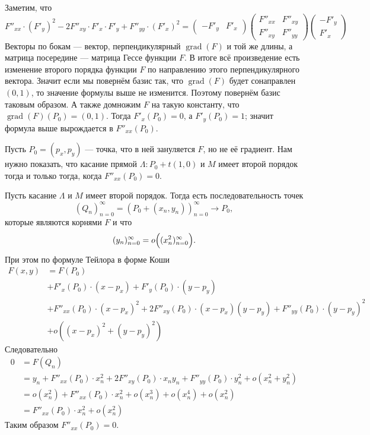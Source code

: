 \documentclass[12pt,a4paper]{article}
\DeclareMathOperator{\grad}{grad}
\begin{document}
    \begin{enumproblem}
        Заметим, что
        \[
            F''_{xx} \cdot (F'_y)^2 - 2 F''_{xy} \cdot F'_x \cdot F'_y + F''_{yy} \cdot (F'_x)^2
            =
            \begin{pmatrix}
                -F'_y& F'_x
            \end{pmatrix}
            \begin{pmatrix}
                F''_{xx}& F''_{xy}\\
                F''_{xy}& F''_{yy}
            \end{pmatrix}
            \begin{pmatrix}
                -F'_y\\ F'_x
            \end{pmatrix}
        \]
        Векторы по бокам --- вектор, перпендикулярный $\grad(F)$ и той же длины, а матрица посередине --- матрица Гессе функции $F$. В итоге всё произведение есть изменение второго порядка функции $F$ по направлению этого перпендикулярного вектора. Значит если мы повернём базис так, что $\grad(F)$ будет сонаправлен $(0, 1)$, то значение формулы выше не изменится. Поэтому повернём базис таковым образом. А также домножим $F$ на такую константу, что $\grad(F)(P_0) = (0, 1)$. Тогда $F'_x(P_0) = 0$, а $F'_y(P_0) = 1$; значит формула выше вырождается в $F''_{xx}(P_0)$.

        Пусть $P_0 = (p_x, p_y)$ --- точка, что в ней зануляется $F$, но не её градиент. Нам нужно показать, что касание прямой $\Lambda: P_0 + t (1, 0)$ и $M$ имеет второй порядок тогда и только тогда, когда $F''_{xx}(P_0) = 0$.

        Пусть касание $\Lambda$ и $M$ имеет второй порядок. Тогда есть последовательность точек
        \[(Q_n)_{n=0}^\infty = (P_0 + (x_n, y_n))_{n=0}^\infty \to P_0,\]
        которые являются корнями $F$ и что
        \[(y_n)_{n=0}^\infty = o\Bigl((x_n^2)_{n=0}^\infty\Bigr).\]
        При этом по формуле Тейлора в форме Коши
        \begin{align*}
            F(x, y)
            &= F(P_0)\\
            &+ F'_{x}(P_0) \cdot (x - p_x) + F'_{y}(P_0) \cdot (y - p_y)\\
            &+ F''_{xx}(P_0) \cdot (x - p_x)^2 + 2F''_{xy}(P_0) \cdot (x - p_x)(y - p_y) + F''_{yy}(P_0) \cdot (y - p_y)^2\\
            &+ o((x - p_x)^2 + (y - p_y)^2)
        \end{align*}
        Следовательно
        \begin{align*}
            0
            &= F(Q_n)\\
            &= y_n + F''_{xx}(P_0) \cdot x_n^2 + 2F''_{xy}(P_0) \cdot x_n y_n + F''_{yy}(P_0) \cdot y_n^2 + o(x_n^2 + y_n^2)\\
            &= o(x_n^2) + F''_{xx}(P_0) \cdot x_n^2 + o(x_n^3) + o(x_n^4) + o(x_n^2)\\
            &= F''_{xx}(P_0) \cdot x_n^2 + o(x_n^2)
        \end{align*}
        Таким образом $F''_{xx}(P_0) = 0$.


\end{enumproblem}
\end{document}
